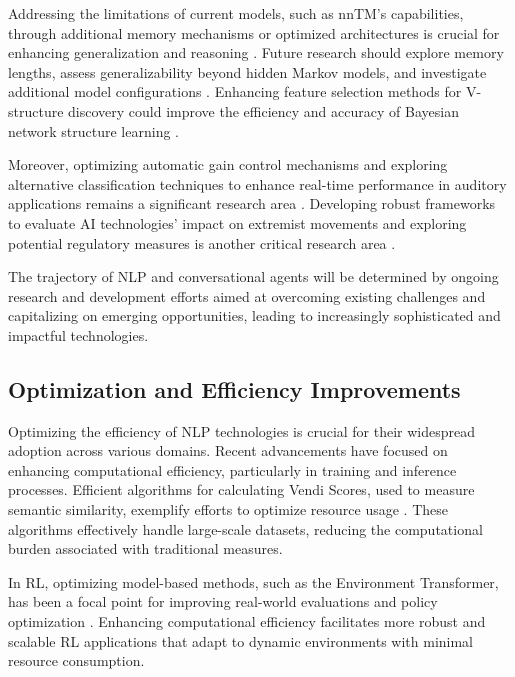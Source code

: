 Addressing the limitations of current models, such as nnTM's capabilities, through additional memory mechanisms or optimized architectures is crucial for enhancing generalization and reasoning \cite{stogin2022provablystableneuralnetwork}. Future research should explore memory lengths, assess generalizability beyond hidden Markov models, and investigate additional model configurations \cite{lathouwers2017memorypaysdiscordhidden}. Enhancing feature selection methods for V-structure discovery could improve the efficiency and accuracy of Bayesian network structure learning \cite{ling2021bayesiannetworkstructurelearning}.

Moreover, optimizing automatic gain control mechanisms and exploring alternative classification techniques to enhance real-time performance in auditory applications remains a significant research area \cite{haghighi2017eegassistedmodulationsoundsources}. Developing robust frameworks to evaluate AI technologies' impact on extremist movements and exploring potential regulatory measures is another critical research area \cite{mcguffie2020radicalizationrisksgpt3advanced}.

The trajectory of NLP and conversational agents will be determined by ongoing research and development efforts aimed at overcoming existing challenges and capitalizing on emerging opportunities, leading to increasingly sophisticated and impactful technologies.


\subsection{Optimization and Efficiency Improvements} \label{subsec:Optimization and Efficiency Improvements}

Optimizing the efficiency of NLP technologies is crucial for their widespread adoption across various domains. Recent advancements have focused on enhancing computational efficiency, particularly in training and inference processes. Efficient algorithms for calculating Vendi Scores, used to measure semantic similarity, exemplify efforts to optimize resource usage \cite{pasarkar2024cousinsvendiscorefamily}. These algorithms effectively handle large-scale datasets, reducing the computational burden associated with traditional measures.

In RL, optimizing model-based methods, such as the Environment Transformer, has been a focal point for improving real-world evaluations and policy optimization \cite{wang2023environmenttransformerpolicyoptimization}. Enhancing computational efficiency facilitates more robust and scalable RL applications that adapt to dynamic environments with minimal resource consumption.

